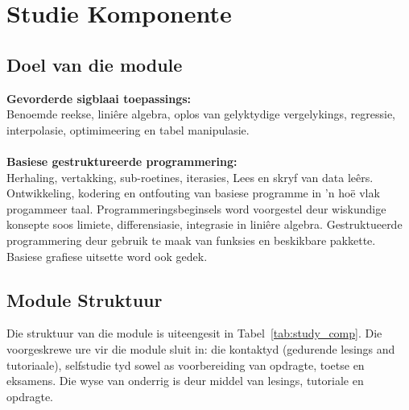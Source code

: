 \section{Studie Komponente}
 \subsection{Doel van die module}
        {\bf Gevorderde sigblaai toepassings:} \\
        Benoemde reekse, lini\^{e}re algebra,
        oplos van gelyktydige vergelykings, regressie, interpolasie,
        optimimeering en tabel manipulasie. \\ \\
        
        {\bf Basiese gestruktureerde programmering:} \\
        Herhaling, vertakking, sub-roetines, iterasies, Lees en skryf van data le\^{e}rs.
        Ontwikkeling, kodering en ontfouting van basiese programme in 'n ho\"{e} vlak
        progammeer taal. Programmeringsbeginsels word voorgestel deur wiskundige 
        konsepte soos limiete, differensiasie, integrasie in lini\^{e}re algebra. 
        Gestruktueerde programmering deur gebruik te maak van funksies en 
        beskikbare pakkette.  Basiese grafiese uitsette word ook gedek.

    \subsection{Module Struktuur}
	Die struktuur van die module is uiteengesit in Tabel~\ref{tab:study_comp}.
	Die voorgeskrewe ure vir die module sluit in: die kontaktyd (gedurende lesings and tutoriaale),
	selfstudie tyd sowel as voorbereiding van opdragte, toetse en 
	eksamens. Die wyse van onderrig is deur middel van lesings, tutoriale en opdragte.
    
